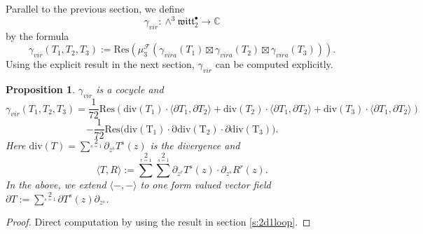 \documentclass[11pt]{amsart}
\newtheorem{prop}[thm]{Proposition}
\theoremstyle{definition}
\theoremstyle{remark}
\numberwithin{equation}{section}
\begin{document}
Parallel to the previous section, we define
$$
\gamma_{vir}:\wedge^3 \mathfrak{witt}^{\bullet}_{2}\rightarrow \mathbb{C}
$$
by the formula
$$
\gamma_{vir}(T_1,T_2,T_3):=\mathrm{Res}\left(\mu^{\mathcal{F}}_3(\gamma_{vira}(T_1)\boxtimes \gamma_{vira}(T_2)\boxtimes \gamma_{vira}(T_3) )\right).
$$
Using the explicit result in the next section, $\gamma_{vir}$ can be computed explicitly.
\begin{prop}
    $\gamma_{vir}$ is a cocycle and
    $$
    \gamma_{vir}(T_1,T_2,T_3)=\frac{1}{72}\mathrm{Res}(\mathrm{div}(T_1)\cdot \langle\partial T_1,\partial T_2\rangle+\mathrm{div}(T_2)\cdot \langle\partial T_1,\partial T_2\rangle+\mathrm{div}(T_3)\cdot \langle\partial T_1,\partial T_2\rangle)
    $$
    $$
    - \frac{1}{72}\mathrm{Res(\mathrm{div(T_1)}\cdot \partial}\mathrm{div(T_2)}\cdot\partial\mathrm{div(T_3)}).
    $$
    Here $\mathrm{div}(T)=\sum^2\limits_{s=1}\partial_{z^s}T^s(z)$ is the divergence and
    $$
   \langle T,R\rangle:=\sum^2\limits_{r=1}\sum^2\limits_{s=1}\partial_{z^r} T^s(z)\cdot \partial_{z^s}R^r(z).
    $$
    In the above, we extend $\langle-,-\rangle$ to one form valued vector field $\partial T:=\sum^2\limits_{s=1}\partial T^s(z)\partial_{z^s}$.
\end{prop}
\begin{proof}
    Direct computation by using the result in section \ref{s:2d1loop}.
\end{proof}
\end{document}

